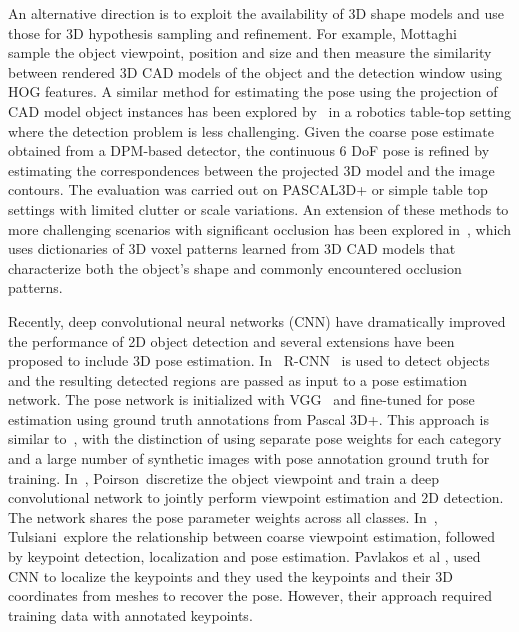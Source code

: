 \documentclass[10pt,twocolumn,letterpaper]{article}
\begin{document}
An alternative direction is to exploit the availability of 3D shape models and use those for 3D hypothesis sampling and refinement. For example,  Mottaghi~\etal~\cite{mottaghi_cvpr15} sample the object viewpoint, position and size and then measure the similarity between rendered 3D CAD models of the object
and the detection window using HOG features. A similar method for estimating the pose using the projection of CAD model object instances has been explored by~\cite{ZhuDaniilidisICRA13} in a robotics table-top setting where the detection problem is less challenging. Given the coarse pose estimate obtained from a DPM-based detector, the continuous 6 DoF pose is refined by estimating the correspondences between the projected 3D model and the image contours. The evaluation was carried out on PASCAL3D+ or simple table top settings with limited clutter or scale variations. An extension of these methods to more challenging scenarios with significant occlusion has been explored in~\cite{3DVP15}, which uses dictionaries of 3D voxel patterns learned from 3D CAD models that characterize both the object's shape and commonly encountered occlusion patterns.

Recently, deep convolutional neural networks (CNN) have dramatically improved the performance of 2D object detection and several extensions have been proposed to include 3D pose estimation. In~\cite{TulsianiCVPR15} R-CNN~\cite{R-CNN_CVPR15} is used to detect objects and the resulting detected regions are passed as input to a pose estimation network. The pose network is initialized with VGG~\cite{Simonyan14c} and fine-tuned for pose estimation using ground truth annotations from Pascal 3D+. This approach is similar to~\cite{SuICCV15}, with the distinction of using separate pose weights for each category and a large number of synthetic images with pose annotation ground truth for training.
In~\cite{PoirsonBerg3DV16}, Poirson~\etal discretize the object viewpoint and train a deep convolutional network to jointly perform viewpoint estimation and 2D detection. The network shares the pose parameter weights across all classes. 
In~\cite{TulsianiCVPR15}, Tulsiani~\etal explore the relationship between coarse viewpoint estimation, followed by keypoint detection, localization and pose estimation. Pavlakos et al \cite{PavlakosICRA17}, used CNN to localize the keypoints and they used the keypoints and their 3D coordinates from meshes to recover the pose. However, their approach required training data with annotated keypoints. 
\end{document}
